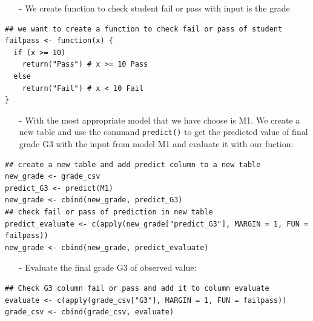 \documentclass[a4paper]{article}
\numberwithin{equation}{section}
\begin{document}
\begin{itemize}
  \item[-] We create function to check student fail or pass with input is the grade
\end{itemize}

\begin{mdframed}[leftline=false,rightline=false,backgroundcolor=magenta!10,nobreak=true]
  \begin{verbatim}
## we want to create a function to check fail or pass of student
failpass <- function(x) {
  if (x >= 10)
    return("Pass") # x >= 10 Pass
  else
    return("Fail") # x < 10 Fail
}
  \end{verbatim}
\end{mdframed}

\begin{itemize}
  \item[-] With the most appropriate model that we have choose is M1. We create a new table and use the command \texttt{predict()} to get the predicted value of final grade G3 with the input from model M1 and evaluate it with our fuction:
\end{itemize}

\begin{mdframed}[leftline=false,rightline=false,backgroundcolor=magenta!10,nobreak=true]
  \begin{verbatim}
## create a new table and add predict column to a new table
new_grade <- grade_csv
predict_G3 <- predict(M1)
new_grade <- cbind(new_grade, predict_G3)
## check fail or pass of prediction in new table
predict_evaluate <- c(apply(new_grade["predict_G3"], MARGIN = 1, FUN = failpass))
new_grade <- cbind(new_grade, predict_evaluate)
  \end{verbatim}
\end{mdframed}

\begin{itemize}
  \item[-] Evaluate the final grade G3 of observed value:
\end{itemize}

\begin{mdframed}[leftline=false,rightline=false,backgroundcolor=magenta!10,nobreak=true]
  \begin{verbatim}
## Check G3 column fail or pass and add it to column evaluate
evaluate <- c(apply(grade_csv["G3"], MARGIN = 1, FUN = failpass))
grade_csv <- cbind(grade_csv, evaluate)
  \end{verbatim}
\end{mdframed}


\begin{mdframed}[leftline=false,rightline=false,backgroundcolor=magenta!10,nobreak=true]
  \begin{verbatim}

  \end{verbatim}
\end{mdframed}

\newpage
\end{document}

